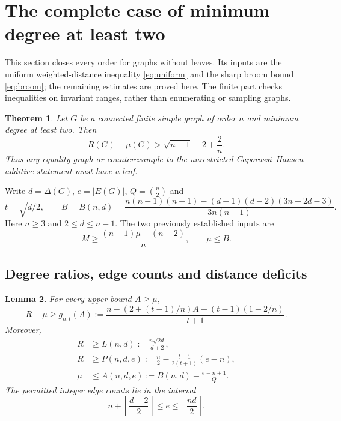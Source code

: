 \documentclass[11pt,a4paper]{article}
\newtheorem{theorem}{Theorem}[section]
\newtheorem{lemma}[theorem]{Lemma}
\theoremstyle{remark}\newtheorem{remark}[theorem]{Remark}
\begin{document}
\section{The complete case of minimum degree at least two}
\label{sec:ch-mindegree2}

This section closes every order for graphs without leaves. Its inputs are
the uniform weighted-distance inequality \eqref{eq:uniform} and the sharp
broom bound \eqref{eq:broom}; the remaining estimates are proved here.
The finite part checks inequalities on invariant ranges, rather than
enumerating or sampling graphs.

\begin{theorem}\label{thm:ch-mindegree2}
Let $G$ be a connected finite simple graph of order $n$ and minimum degree
at least two. Then
\[
 R(G)-\mu(G)>\sqrt{n-1}-2+\frac2n.
\]
Thus any equality graph or counterexample to the unrestricted
Caporossi--Hansen additive statement must have a leaf.
\end{theorem}

Write $d=\Delta(G)$, $e=|E(G)|$, $Q=\binom n2$ and
\[
 t=\sqrt{d/2},\qquad
 B=B(n,d)=
 \frac{n(n-1)(n+1)-(d-1)(d-2)(3n-2d-3)}
      {3n(n-1)}.
\]
Here $n\ge3$ and $2\le d\le n-1$. The two previously established inputs are
\begin{equation}\label{eq:md2-inputs}
 M\ge\frac{(n-1)\mu-(n-2)}n,\qquad \mu\le B.
\end{equation}

\subsection{Degree ratios, edge counts and distance deficits}

\begin{lemma}\label{lem:md2-bounds}
For every upper bound $A\ge\mu$,
\begin{equation}\label{eq:md2-g}
 R-\mu\ge
 g_{n,t}(A):=
 \frac{n-(2+(t-1)/n)A-(t-1)(1-2/n)}{t+1}.
\end{equation}
Moreover,
\begin{align}
 R&\ge L(n,d):=\frac{n\sqrt{2d}}{d+2},\label{eq:md2-dalfo}\\
 R&\ge P(n,d,e):=
 \frac n2-\frac{t-1}{2(t+1)}(e-n),\label{eq:md2-energy}\\
 \mu&\le A(n,d,e):=B(n,d)-\frac{e-n+1}{Q}.\label{eq:md2-edge-distance}
\end{align}
The permitted integer edge counts lie in the interval
\begin{equation}\label{eq:md2-edge-range}
 n+\left\lceil\frac{d-2}{2}\right\rceil
 \le e\le\left\lfloor\frac{nd}{2}\right\rfloor.
\end{equation}
\end{lemma}
\end{document}
